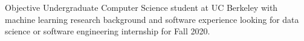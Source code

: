 \begin{rSection}{Objective}
Undergraduate Computer Science student at UC Berkeley with machine learning research background and software experience looking for data science or software engineering internship for Fall 2020.
\end{rSection}